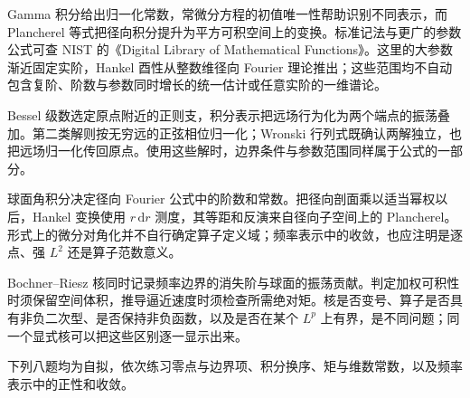 \ProseParagraphBreak

Gamma 积分给出归一化常数，常微分方程的初值唯一性帮助识别不同表示，而 Plancherel 等式把径向积分提升为平方可积空间上的变换。标准记法与更广的参数公式可查 NIST 的《Digital Library of Mathematical Functions》\cite[Chapter 10]{NationalInstituteofStandardsNIST}。这里的大参数渐近固定实阶，Hankel 酉性从整数维径向 Fourier 理论推出；这些范围均不自动包含复阶、阶数与参数同时增长的统一估计或任意实阶的一维谱论。





\begin{chaptersummary}
Bessel 级数选定原点附近的正则支，积分表示把远场行为化为两个端点的振荡叠加。第二类解则按无穷远的正弦相位归一化；Wronski 行列式既确认两解独立，也把远场归一化传回原点。使用这些解时，边界条件与参数范围同样属于公式的一部分。

\ProseParagraphBreak

球面角积分决定径向 Fourier 公式中的阶数和常数。把径向剖面乘以适当幂权以后，Hankel 变换使用 \(r\,\mathrm dr\) 测度，其等距和反演来自径向子空间上的 Plancherel。形式上的微分对角化并不自行确定算子定义域；频率表示中的收敛，也应注明是逐点、强 \(L^2\) 还是算子范数意义。

\ProseParagraphBreak

Bochner--Riesz 核同时记录频率边界的消失阶与球面的振荡贡献。判定加权可积性时须保留空间体积，推导逼近速度时须检查所需绝对矩。核是否变号、算子是否具有非负二次型、是否保持非负函数，以及是否在某个 \(L^p\) 上有界，是不同问题；同一个显式核可以把这些区别逐一显示出来。
\end{chaptersummary}
\BookExercises

下列八题均为自拟，依次练习零点与边界项、积分换序、矩与维数常数，以及频率表示中的正性和收敛。

